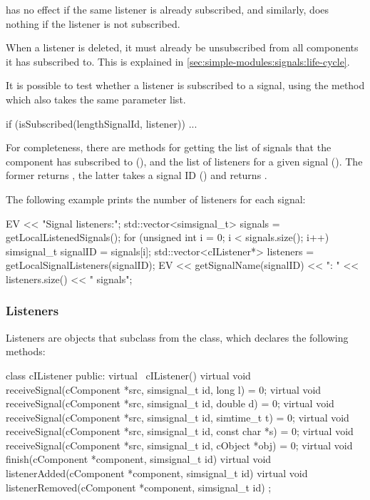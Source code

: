  has no effect if the same listener is already
subscribed, and similarly,  does nothing
if the listener is not subscribed.

\begin{note}
  When a listener is deleted, it must already be unsubscribed from
  all components it has subscribed to. This is explained in
  \ref{sec:simple-modules:signals:life-cycle}.
\end{note}

It is possible to test whether a listener is subscribed to a signal,
using the  method which also takes the same
parameter list.

\begin{cpp}
if (isSubscribed(lengthSignalId, listener))
{
    ...
}
\end{cpp}

For completeness, there are methods for getting the list of signals
that the component has subscribed to (),
and the list of listeners for a given signal ().
The former returns , the latter takes
a signal ID () and returns .

The following example prints the number of listeners for each signal:

\begin{cpp}
EV << "Signal listeners:\n";
std::vector<simsignal_t> signals = getLocalListenedSignals();
for (unsigned int i = 0; i < signals.size(); i++) {
    simsignal_t signalID = signals[i];
    std::vector<cIListener*> listeners = getLocalSignalListeners(signalID);
    EV << getSignalName(signalID) << ": " << listeners.size() << " signals\n";
}
\end{cpp}

\subsubsection{Listeners}

Listeners are objects that subclass from the  class, which
declares the following methods:

\begin{cpp}
class cIListener
{
  public:
    virtual ~cIListener() {}
    virtual void receiveSignal(cComponent *src, simsignal_t id, long l) = 0;
    virtual void receiveSignal(cComponent *src, simsignal_t id, double d) = 0;
    virtual void receiveSignal(cComponent *src, simsignal_t id, simtime_t t) = 0;
    virtual void receiveSignal(cComponent *src, simsignal_t id, const char *s) = 0;
    virtual void receiveSignal(cComponent *src, simsignal_t id, cObject *obj) = 0;
    virtual void finish(cComponent *component, simsignal_t id) {}
    virtual void listenerAdded(cComponent *component, simsignal_t id) {}
    virtual void listenerRemoved(cComponent *component, simsignal_t id) {}
};
\end{cpp}

